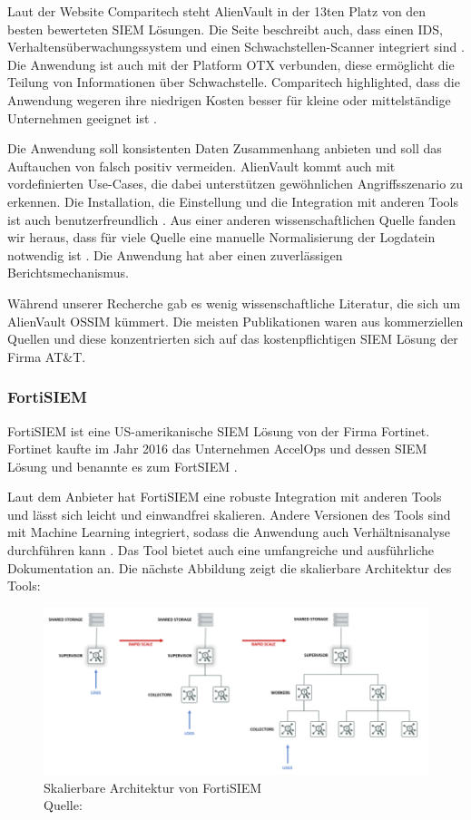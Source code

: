 Laut der Website Comparitech steht AlienVault in der 13ten Platz von den besten bewerteten \gls{SIEM} Lösungen. Die Seite beschreibt auch, dass einen \gls{IDS}, Verhaltensüberwachungssystem und einen Schwachstellen-Scanner integriert sind . Die Anwendung ist auch mit der Platform \gls{OTX} verbunden, diese ermöglicht die Teilung von Informationen über Schwachstelle. Comparitech highlighted, dass die Anwendung wegeren ihre niedrigen Kosten besser für kleine oder mittelständige Unternehmen geeignet ist \citep{comparitech_SIEM}. 

Die Anwendung soll konsistenten Daten Zusammenhang anbieten und soll das Auftauchen von \gls{falsch positiv} vermeiden. AlienVault kommt auch mit vordefinierten Use-Cases, die dabei unterstützen gewöhnlichen Angriffsszenario zu erkennen. Die Installation, die Einstellung und die Integration mit anderen Tools ist auch benutzerfreundlich \citep{Gomes_AV}. Aus einer anderen wissenschaftlichen Quelle fanden wir heraus, dass für viele  Quelle eine manuelle Normalisierung der Logdatein notwendig ist \cite{Nabil_AV}. Die Anwendung hat aber einen zuverlässigen Berichtsmechanismus.

Während unserer Recherche gab es wenig wissenschaftliche Literatur, die sich um AlienVault OSSIM kümmert. Die meisten Publikationen waren aus kommerziellen Quellen und diese konzentrierten sich auf das kostenpflichtigen \gls{SIEM} Lösung der Firma AT\&T.

\subsubsection{FortiSIEM}
FortiSIEM ist eine US-amerikanische \gls{SIEM} Lösung von der Firma Fortinet. Fortinet kaufte im Jahr 2016 das Unternehmen AccelOps und dessen \gls{SIEM} Lösung und benannte es zum FortSIEM \citep{Fortinet_Press}. 

Laut dem Anbieter hat FortiSIEM eine robuste Integration mit anderen Tools und lässt sich leicht und einwandfrei skalieren. Andere Versionen des Tools sind mit Machine Learning integriert, sodass die Anwendung auch Verhältnisanalyse durchführen kann \citep{Fortinet_Solutions}. Das Tool bietet auch eine umfangreiche und ausführliche Dokumentation an. Die nächste Abbildung zeigt die skalierbare Architektur des Tools:

\begin{figure}[H]
   \centering
   \includegraphics[width=1\textwidth]{assets/2_p7.png}
   \caption{Skalierbare Architektur von FortiSIEM \\Quelle: \citep{Fortinet_Arch} }
   \centering
\end{figure}

